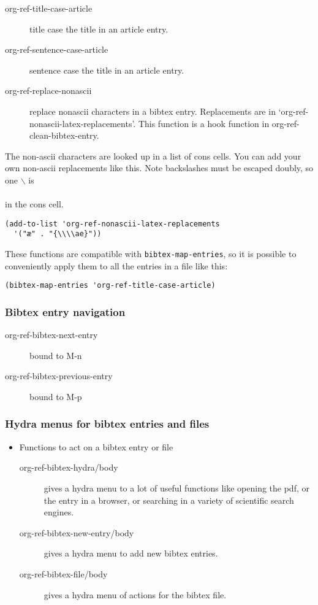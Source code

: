 \documentclass[11pt]{article}
\begin{document}
{\begin{description}
\item[{org-ref-title-case-article}] title case the title in an article entry.
\item[{org-ref-sentence-case-article}] sentence case the title in an article entry.

\item[{org-ref-replace-nonascii}] replace nonascii characters in a bibtex
entry. Replacements are in `org-ref-nonascii-latex-replacements'. This
function is a hook function in org-ref-clean-bibtex-entry.
\end{description}

The non-ascii characters are looked up in a list of cons cells. You can add your own non-ascii replacements like this. Note backslashes must be escaped doubly, so one $\backslash$ is \\\\ in the cons cell.

\begin{verbatim}
(add-to-list 'org-ref-nonascii-latex-replacements
  '("æ" . "{\\\\ae}"))
\end{verbatim}

These functions are compatible with \verb~bibtex-map-entries~, so it is possible to conveniently apply them to all the entries in a file like this:

\begin{verbatim}
(bibtex-map-entries 'org-ref-title-case-article)
\end{verbatim}


\subsubsection{Bibtex entry navigation}
\label{sec-2-2-3}
\begin{description}
\item[{org-ref-bibtex-next-entry}] bound to M-n
\item[{org-ref-bibtex-previous-entry}] bound to M-p
\end{description}

\subsubsection{Hydra menus for bibtex entries and files}
\label{sec-2-2-4}
\begin{itemize}
\item Functions to act on a bibtex entry or file
\begin{description}
\item[{org-ref-bibtex-hydra/body}] gives a hydra menu to a lot of useful functions
like opening the pdf, or the entry in a browser, or searching in a
variety of scientific search engines.
\item[{org-ref-bibtex-new-entry/body}] gives a hydra menu to add new bibtex entries.
\item[{org-ref-bibtex-file/body}] gives a hydra menu of actions for the bibtex file.
\end{description}
\end{itemize}

}
\end{document}
